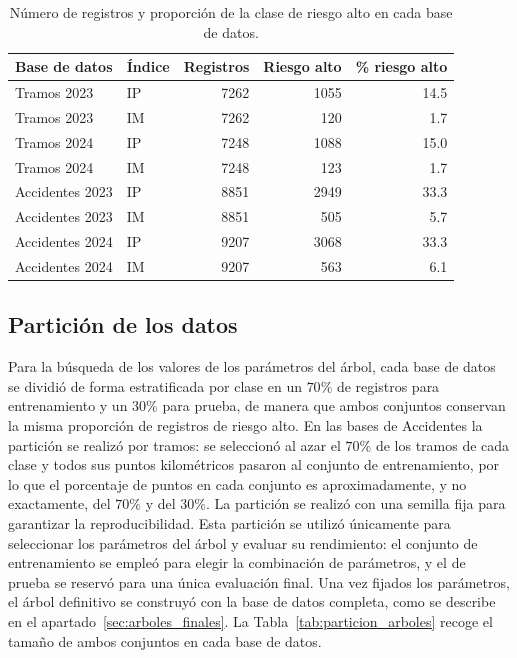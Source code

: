 \documentclass[twoside,a4paper,12pt,onecolumn,openany]{book}
\begin{document}
\begin{table}[H]
\centering
\small
\begin{tabular}{llrrr}
\toprule
\textbf{Base de datos} & \textbf{Índice} & \textbf{Registros} & \textbf{Riesgo alto} & \textbf{\% riesgo alto} \\
\midrule
Tramos 2023     & IP & 7262 & 1055 & 14.5 \\
Tramos 2023     & IM & 7262 & 120  & 1.7  \\
Tramos 2024     & IP & 7248 & 1088 & 15.0 \\
Tramos 2024     & IM & 7248 & 123  & 1.7  \\
\midrule
Accidentes 2023 & IP & 8851 & 2949 & 33.3 \\
Accidentes 2023 & IM & 8851 & 505  & 5.7  \\
Accidentes 2024 & IP & 9207 & 3068 & 33.3 \\
Accidentes 2024 & IM & 9207 & 563  & 6.1  \\
\bottomrule
\end{tabular}
\caption{Número de registros y proporción de la clase de riesgo alto en cada base de datos.}
\label{tab:clases_arboles}
\end{table}
 
\subsection{Partición de los datos}
 
Para la búsqueda de los valores de los parámetros del árbol, cada base de datos se dividió de forma estratificada por clase en un $70\%$ de registros para entrenamiento y un $30\%$ para prueba, de manera que ambos conjuntos conservan la misma proporción de registros de riesgo alto. En las bases de Accidentes la partición se realizó por tramos: se seleccionó al azar el $70\%$ de los tramos de cada clase y todos sus puntos kilométricos pasaron al conjunto de entrenamiento, por lo que el porcentaje de puntos en cada conjunto es aproximadamente, y no exactamente, del $70\%$ y del $30\%$. La partición se realizó con una semilla fija para garantizar la reproducibilidad. Esta partición se utilizó únicamente para seleccionar los parámetros del árbol y evaluar su rendimiento: el conjunto de entrenamiento se empleó para elegir la combinación de parámetros, y el de prueba se reservó para una única evaluación final. Una vez fijados los parámetros, el árbol definitivo se construyó con la base de datos completa, como se describe en el apartado~\ref{sec:arboles_finales}. La Tabla~\ref{tab:particion_arboles} recoge el tamaño de ambos conjuntos en cada base de datos.
 
\end{document}
